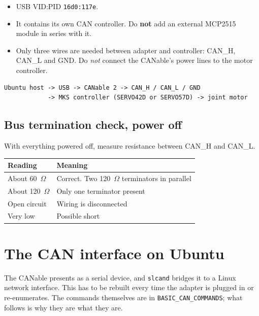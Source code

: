 \documentclass[11pt,letterpaper]{article}
\begin{document}
\begin{itemize}[leftmargin=*]
    \item USB VID:PID \texttt{16d0:117e}.
    \item It contains its own CAN controller. Do \textbf{not} add an external MCP2515
          module in series with it.
    \item Only three wires are needed between adapter and controller: CAN\_H, CAN\_L
          and GND. Do \emph{not} connect the CANable's power lines to the motor
          controller.
\end{itemize}

\begin{lstlisting}
Ubuntu host -> USB -> CANable 2 -> CAN_H / CAN_L / GND
            -> MKS controller (SERVO42D or SERVO57D) -> joint motor
\end{lstlisting}

\subsection{Bus termination check, power off}

With everything powered off, measure resistance between CAN\_H and CAN\_L.

\begin{center}
\begin{tabular}{ll}
\toprule
\textbf{Reading} & \textbf{Meaning} \\ \midrule
About 60~$\Omega$  & Correct. Two 120~$\Omega$ terminators in parallel \\
About 120~$\Omega$ & Only one terminator present \\
Open circuit       & Wiring is disconnected \\
Very low           & Possible short \\
\bottomrule
\end{tabular}
\end{center}

\section{The CAN interface on Ubuntu}
\label{sec:can-interface}

The CANable presents as a serial device, and \texttt{slcand} bridges it to a Linux
network interface. This has to be rebuilt every time the adapter is plugged in or
re-enumerates. The commands themselves are in \texttt{BASIC\_CAN\_COMMANDS}; what
follows is why they are what they are.
\end{document}
